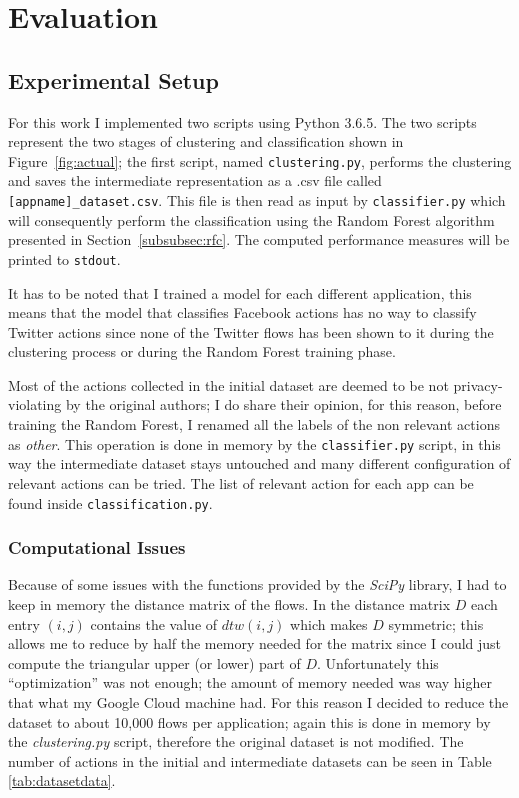\section{Evaluation}
\label{sec:eval}
\subsection{Experimental Setup}
For this work I implemented two scripts using Python 3.6.5. The two scripts represent the two stages of clustering and classification shown in Figure~\ref{fig:actual}; the first script, named \texttt{clustering.py}, performs the clustering and saves the intermediate representation as a .csv file called \texttt{[appname]\_dataset.csv}. This file is then read as input by \texttt{classifier.py} which will consequently perform the classification using the Random Forest algorithm presented in Section~\ref{subsubsec:rfc}. The computed performance measures will be printed to \texttt{stdout}.

It has to be noted that I trained a model for each different application, this means that the model that classifies Facebook actions has no way to classify Twitter actions since none of the Twitter flows has been shown to it during the clustering process or during the Random Forest training phase.

Most of the actions collected in the initial dataset are deemed to be not privacy-violating by the original authors; I do share their opinion, for this reason, before training the Random Forest, I renamed all the labels of the non relevant actions as \textit{other}. This operation is done in memory by the \texttt{classifier.py} script, in this way the intermediate dataset stays untouched and many different configuration of relevant actions can be tried. The list of relevant action for each app can be found inside \texttt{classification.py}.


\subsubsection{Computational Issues}
Because of some issues with the functions provided by the \textit{SciPy} library, I had to keep in memory the distance matrix of the flows. In the distance matrix $D$ each entry $(i,j)$ contains the value of $dtw(i, j)$ which makes $D$ symmetric; this allows me to reduce by half the memory needed for the matrix since I could just compute the triangular upper (or lower) part of $D$. Unfortunately this ``optimization'' was not enough; the amount of memory needed was way higher that what my Google Cloud machine had. For this reason I decided to reduce the dataset to about 10,000 flows per application; again this is done in memory by the \textit{clustering.py} script, therefore the original dataset is not modified. The number of actions in the initial and intermediate datasets can be seen in Table \ref{tab:datasetdata}.

